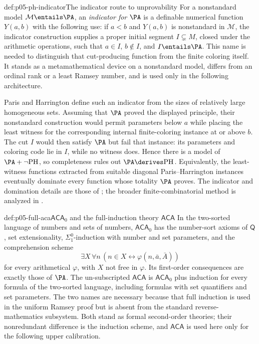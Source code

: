 \begin{hbmethod}{def:p05-ph-indicator}{The indicator route to unprovability}
For a nonstandard model \(\mathcal M\entails\PA\), an \emph{indicator for
\(\PA\)} is a definable numerical function \(Y(a,b)\) with the following use:
if \(a<b\) and \(Y(a,b)\) is nonstandard in \(\mathcal M\), the indicator
construction supplies a proper initial segment \(I\subsetneq M\), closed under
the arithmetic operations, such that \(a\in I\), \(b\notin I\), and
\(I\entails\PA\).  This name is needed to distinguish that cut-producing
function from the finite coloring itself.  It stands as a metamathematical
device on a nonstandard model, differs from an ordinal rank or a least Ramsey
number, and is used only in the following architecture.

Paris and Harrington define such an indicator from the sizes of relatively
large homogeneous sets.  Assuming that \(\PA\) proved the displayed principle,
their nonstandard construction would permit parameters below \(a\) while
placing the least witness for the corresponding internal finite-coloring
instance at or above \(b\).  The cut \(I\) would then satisfy \(\PA\) but fail
that instance: its parameters and coloring code lie in \(I\), while no witness
does.  Hence there is a model of \(\PA+\neg\mathrm{PH}\), so completeness
rules out \(\PA\derives\mathrm{PH}\).  Equivalently, the least-witness
functions extracted from suitable diagonal Paris--Harrington instances
eventually dominate every function whose totality \(\PA\) proves.  The
indicator and domination details are those of
\cite{ParisHarrington1977}; the broader finite-combinatorial method is
analyzed in \cite{KanamoriMcAloon1987}.
\end{hbmethod}

\begin{hbdefinition}{def:p05-full-aca}{\(\mathsf{ACA}_0\) and the full-induction theory \(\mathsf{ACA}\)}
In the two-sorted language of numbers and sets of numbers,
\(\mathsf{ACA}_0\) has the number-sort axioms of \(\mathsf Q\), set
extensionality, \(\Sigma^0_1\)-induction with number and set parameters, and
the comprehension scheme
\[
 \exists X\,\forall n\,(n\in X\leftrightarrow\varphi(n,\bar a,\bar A))
\]
for every arithmetical \(\varphi\), with \(X\) not free in \(\varphi\).
Its first-order consequences are exactly those of \(\PA\).
The un-subscripted \(\mathsf{ACA}\) is \(\mathsf{ACA}_0\) plus induction for
every formula of the two-sorted language, including formulas with set
quantifiers and set parameters.  The two names are necessary because that
full induction is used in the uniform Ramsey proof but is absent from the
standard reverse-mathematics subsystem.  Both stand as formal second-order
theories; their nonredundant difference is the induction scheme, and
\(\mathsf{ACA}\) is used here only for the following upper calibration.
\end{hbdefinition}

